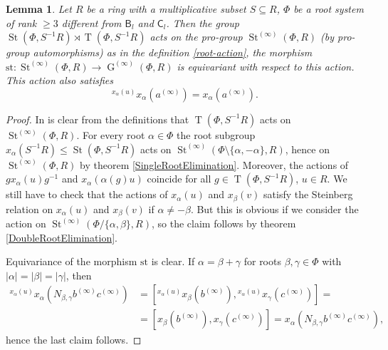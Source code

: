 \documentclass{article}
\numberwithin{equation}{section}
\newtheorem{lemma}{Lemma} \numberwithin{lemma}{section}
\theoremstyle{definition}
\theoremstyle{remark}
\DeclareMathOperator\St{St}
\DeclareMathOperator\GG{G}
\DeclareMathOperator\Torus{T}
\newcommand{\up}[2]{{^{#1}\!{#2}}}
\newcommand{\rB}{\mathsf{B}}
\newcommand{\rC}{\mathsf{C}}
\begin{document}
\begin{lemma}\label{SteinbergLocalAction}
 Let \(R\) be a ring with a multiplicative subset \(S \subseteq R\), \(\Phi\) be a root system of rank \(\geq 3\) different from \(\rB_l\) and \(\rC_l\). Then the group \(\St(\Phi, S^{-1} R) \rtimes \Torus(\Phi, S^{-1} R)\) acts on the pro-group \(\St^{(\infty)}(\Phi, R)\) (by pro-group automorphisms) as in the definition \ref{root-action}, the morphism \(\mathrm{st} \colon \St^{(\infty)}(\Phi, R) \to \GG^{(\infty)}(\Phi, R)\) is equivariant with respect to this action. This action also satisfies
 \[\up{x_\alpha(u)}{x_\alpha(a^{(\infty)})} = x_\alpha(a^{(\infty)}).\]
\end{lemma}
\begin{proof}
 In is clear from the definitions that \(\Torus(\Phi, S^{-1} R)\) acts on \(\St^{(\infty)}(\Phi, R)\). For every root \(\alpha \in \Phi\) the root subgroup \(x_\alpha(S^{-1} R) \leq \St(\Phi, S^{-1} R)\) acts on \(\St^{(\infty)}(\Phi \setminus \{\alpha, -\alpha\}, R)\), hence on \(\St^{(\infty)}(\Phi, R)\) by theorem \ref{SingleRootElimination}. Moreover, the actions of \(g x_\alpha(u) g^{-1}\) and \(x_\alpha(\alpha(g) u)\) coincide for all \(g \in \Torus(\Phi, S^{-1} R)\), \(u \in R\). We still have to check that the actions of \(x_\alpha(u)\) and \(x_\beta(v)\) satisfy the Steinberg relation on \(x_\alpha(u)\) and \(x_\beta(v)\) if \(\alpha \neq -\beta\). But this is obvious if we consider the action on \(\St^{(\infty)}(\Phi / \{\alpha, \beta\}, R)\), so the claim follows by theorem \ref{DoubleRootElimination}.

 Equivariance of the morphism \(\mathrm{st}\) is clear. If \(\alpha = \beta + \gamma\) for roots \(\beta, \gamma \in \Phi\) with \(|\alpha| = |\beta| = |\gamma|\), then
 \begin{align*}
  \up{x_\alpha(u)}{x_\alpha(N_{\beta, \gamma} b^{(\infty)} c^{(\infty)})} &= [\up{x_\alpha(u)}{x_\beta(b^{(\infty)})}, \up{x_\alpha(u)}{x_\gamma(c^{(\infty)})}] =\\
  &= [x_\beta(b^{(\infty)}), x_\gamma(c^{(\infty)})] = x_\alpha(N_{\beta, \gamma} b^{(\infty)} c^{(\infty)}),
 \end{align*}
 hence the last claim follows.
\end{proof}
\end{document}
